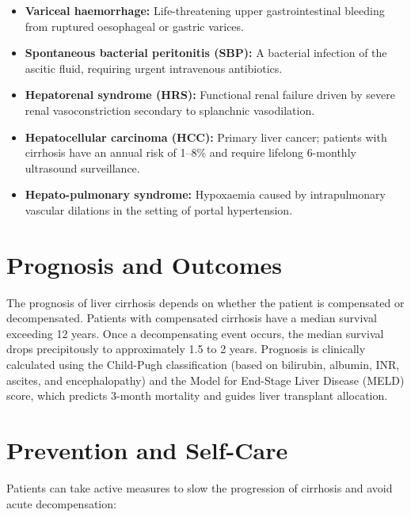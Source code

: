 \begin{itemize}
    \item \textbf{Variceal haemorrhage:} Life-threatening upper gastrointestinal bleeding from ruptured oesophageal or gastric varices.
    \item \textbf{Spontaneous bacterial peritonitis (SBP):} A bacterial infection of the ascitic fluid, requiring urgent intravenous antibiotics.
    \item \textbf{Hepatorenal syndrome (HRS):} Functional renal failure driven by severe renal vasoconstriction secondary to splanchnic vasodilation.
    \item \textbf{Hepatocellular carcinoma (HCC):} Primary liver cancer; patients with cirrhosis have an annual risk of 1--8\% and require lifelong 6-monthly ultrasound surveillance.
    \item \textbf{Hepato-pulmonary syndrome:} Hypoxaemia caused by intrapulmonary vascular dilations in the setting of portal hypertension.
\end{itemize}

\section*{Prognosis and Outcomes}
The prognosis of liver cirrhosis depends on whether the patient is compensated or decompensated. Patients with compensated cirrhosis have a median survival exceeding 12 years. Once a decompensating event occurs, the median survival drops precipitously to approximately 1.5 to 2 years. Prognosis is clinically calculated using the Child-Pugh classification (based on bilirubin, albumin, INR, ascites, and encephalopathy) and the Model for End-Stage Liver Disease (MELD) score, which predicts 3-month mortality and guides liver transplant allocation.

\section*{Prevention and Self-Care}
Patients can take active measures to slow the progression of cirrhosis and avoid acute decompensation:


